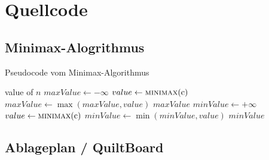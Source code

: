 \chapter{Quellcode}
\label{anhang:chapter-quellcode}



\section{Minimax-Alogrithmus}


\begin{algorithm}
    \caption{Pseudocode vom Minimax-Algorithmus}
    \label{algo:minimax}
    \begin{algorithmic}[1]
                \State \Return value of $n$
                \State $maxValue \gets -\infty$
                    \State $value \gets \Call{minimax}{$c$}$
                    \State $maxValue \gets \max(maxValue, value)$
                \EndFor
                \State \Return $maxValue$
                \State $minValue \gets +\infty$
                    \State $value \gets \Call{minimax}{$c$}$
                    \State $minValue \gets \min(minValue, value)$
                \EndFor
                \State \Return $minValue$
            \EndIf
        \EndFunction
    \end{algorithmic}
\end{algorithm}

\pagebreak

\section{Ablageplan / QuiltBoard}

